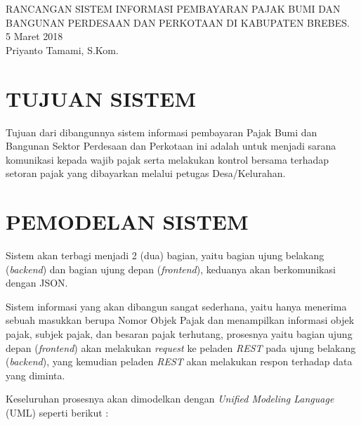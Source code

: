 \documentclass[pdftex,12pt, oneside]{article}
\begin{document}
\sloppy %

\begin{center}
{\large RANCANGAN SISTEM INFORMASI PEMBAYARAN PAJAK BUMI DAN BANGUNAN PERDESAAN DAN PERKOTAAN DI KABUPATEN BREBES.}
\\[1cm]
5 Maret 2018\\
Priyanto Tamami, S.Kom.
\end{center}




\section{TUJUAN SISTEM}

Tujuan dari dibangunnya sistem informasi pembayaran Pajak Bumi dan Bangunan Sektor Perdesaan dan Perkotaan ini adalah untuk menjadi sarana komunikasi kepada wajib pajak serta melakukan kontrol bersama terhadap setoran pajak yang dibayarkan melalui petugas Desa/Kelurahan.


\section{PEMODELAN SISTEM}

Sistem akan terbagi menjadi 2 (dua) bagian, yaitu bagian ujung belakang (\textit{backend}) dan bagian ujung depan (\textit{frontend}), keduanya akan berkomunikasi dengan JSON. 

Sistem informasi yang akan dibangun sangat sederhana, yaitu hanya menerima sebuah masukkan berupa Nomor Objek Pajak dan menampilkan informasi objek pajak, subjek pajak, dan besaran pajak terhutang, prosesnya yaitu bagian ujung depan (\textit{frontend}) akan melakukan \textit{request} ke peladen \textit{REST} pada ujung belakang (\textit{backend}), yang kemudian peladen \textit{REST} akan melakukan respon terhadap data yang diminta. 

Keseluruhan prosesnya akan dimodelkan dengan \textit{Unified Modeling Language} (UML) seperti berikut :
\end{document}
